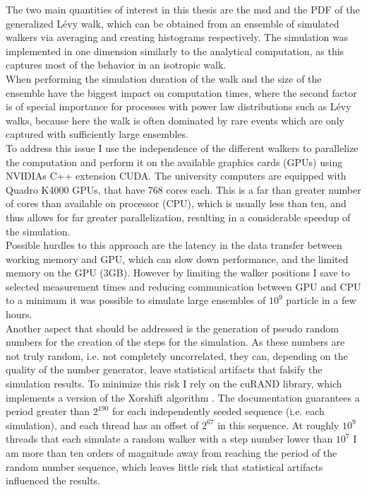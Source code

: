 The two main quantities of interest in this thesis are the \gls{msd} and the \gls{PDF} of the generalized L\'evy walk, which can be obtained from an ensemble of simulated walkers via averaging and creating histograms respectively. The simulation was implemented in one dimension similarly to the analytical computation, as this captures most of the behavior in an isotropic walk. \\
When performing the simulation duration of the walk and the size of the ensemble have the biggest impact on computation times, where the second factor is of special importance for processes with power law distributions such as L\'evy walks, because here the walk is often dominated by rare events which are only captured with sufficiently large ensembles. \\
To address this issue I use the independence of the different walkers to parallelize the computation and perform it on the available graphics cards (GPUs) using NVIDIAs C++ extension CUDA. The university computers are equipped with Quadro K4000 GPUs, that have 768 cores each. This is a far than greater number of cores than available on processor (CPU), which is usually less than ten, and thus allows for far greater parallelization, resulting in a considerable speedup of the simulation.  \\
Possible hurdles to this approach are the latency in the data transfer between working memory and GPU, which can slow down performance, and the limited memory on the GPU (3GB). However by limiting the walker positions I save to selected measurement times and reducing communication between GPU and CPU to a minimum it was possible to simulate large ensembles of $10^9$ particle in a few hours. \\

Another aspect that should be addressed is the generation of pseudo random numbers for the creation of the steps for the simulation. As these numbers are not truly random, i.e. not completely uncorrelated, they can, depending on the quality of the number generator, leave statistical artifacts that falsify the simulation results. To minimize this risk I rely on the cuRAND library, which implements a version of the Xorshift algorithm \cite{marsaglia2003xorshift}. The documentation guarantees a period greater than $2^{190}$ for each independently seeded sequence (i.e. each simulation), and each thread has an offset of $2^{67}$ in this sequence. At roughly $10^{9}$ threads that each simulate a random walker with a step number lower than $10^{7}$ I am more than ten orders of magnitude away from reaching the period of the random number sequence, which leaves little risk that statistical artifacts influenced the results.

